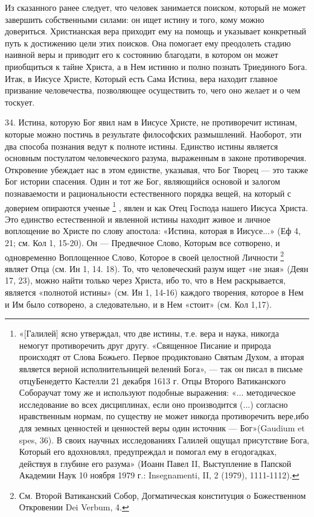 \documentclass[a5paper,10pt]{article}
\begin{document}
Из сказанного ранее следует, что человек занимается поиском, который не может
завершить собственными силами: он ищет истину и того, кому можно довериться.
Христианская вера приходит ему на помощь и указывает конкретный путь к
достижению цели этих поисков. Она помогает ему преодолеть стадию наивной веры и
приводит его к состоянию благодати, в котором он может приобщиться к тайне
Христа, а в Нем истинно и полно познать Триединого Бога. Итак, в Иисусе Христе,
Который есть Сама Истина, вера находит главное призвание человечества,
позволяющее осуществить то, чего оно желает и о чем тоскует.

34. Истина, которую Бог явил нам в Иисусе Христе, не противоречит истинам,
которые можно постичь в результате философских размышлений. Наоборот, эти два
способа познания ведут к полноте истины. Единство истины является основным
постулатом человеческого разума, выраженным в законе противоречия. Откровение
убеждает нас в этом единстве, указывая, что Бог Творец — это также Бог истории
спасения. Один и тот же Бог, являющийся основой и залогом познаваемости и
рациональности естественного порядка вещей, на который с доверием опираются
ученые \footnote{«[Галилей] ясно утверждал, что две истины, т.е. вера и наука,
    никогда немогут противоречить друг другу. «Священное Писание и природа
    происходят от Слова Божьего. Первое продиктовано Святым Духом, а вторая
    является верной исполнительницей велений Бога», — так он писал в письме
    отцуБенедетто Кастелли 21 декабря 1613 г. Отцы Второго Ватиканского
    Собораучат тому же и используют подобные выражения: «... методическое
    исследование во всех дисциплинах, если оно производится (...) согласно
    нравственным нормам, по существу не может никогда противоречить вере,ибо
    для земных ценностей и ценностей веры один источник — Бог»(Gaudium et spes,
    36). В своих научных исследованиях Галилей ощущал присутствие Бога, Который
    его вдохновлял, предупреждал и помогал ему в егодогадках, действуя в
    глубине его разума» (Иоанн Павел II, Выступление в Папской Академии Наук 10
ноября 1979 г.: Insegnamenti, II, 2 (1979), 1111-1112).}  , явлен и как Отец
Господа нашего Иисуса Христа.  Это единство естественной и явленной истины
находит живое и личное воплощение во Христе по слову апостола: «Истина, которая
в Иисусе...» (Еф 4, 21; см. Кол 1, 15-20). Он — Предвечное Слово, Которым все
сотворено, и одновременно Воплощенное Слово, Которое в своей целостной Личности
\footnote{См. Второй Ватиканский Собор, Догматическая конституция о
Божественном Откровении Dei Verbum, 4.}  являет Отца (см. Ин 1, 14. 18). То,
что человеческий разум ищет «не зная» (Деян 17, 23), можно найти только через
Христа, ибо то, что в Нем раскрывается, является «полнотой истины» (см. Ин 1,
14-16) каждого творения, которое в Нем и Им было сотворено, а следовательно, и
в Нем «стоит» (см. Кол 1,17). 
\end{document}
